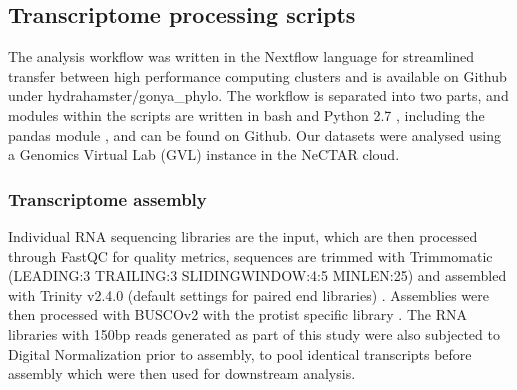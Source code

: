 \documentclass[12pt]{article}
\begin{document}
\subsection*{Transcriptome processing scripts}
The analysis workflow was written in the Nextflow language \cite{nextflow} for streamlined transfer between high performance computing clusters and is available on Github under hydrahamster/gonya\_phylo. 
The workflow is separated into two parts, and modules within the scripts are written in bash and Python 2.7 \cite{python}, including the pandas module \cite{pandas}, and can be found on Github. 
Our datasets were analysed using a Genomics Virtual Lab (GVL) \cite{afgan2015genomics} instance in the NeCTAR cloud.
\subsubsection*{Transcriptome assembly}
Individual RNA sequencing libraries are the input, which are then processed through FastQC \cite{fastqc} for quality metrics, sequences are trimmed with Trimmomatic (LEADING:3 TRAILING:3 SLIDINGWINDOW:4:5 MINLEN:25) \cite{bolger2014trimmomatic} and assembled with Trinity v2.4.0 (default settings for paired end libraries) \cite{haas2013novo}. 
Assemblies were then processed with BUSCOv2 with the protist specific library \cite{simao2015busco}.
The RNA libraries with 150bp reads generated as part of this study were also subjected to Digital Normalization \cite{diginorm} prior to assembly, to pool identical transcripts before assembly which were then used for downstream analysis.                                                                                                                                                                                                                                                                                                                                                                                                                                                                                                                                                                                                                                                                                                                                                                                                                                                                                                                                                                                                                                                                                                                                                                                                                                                                                                                                        
\end{document}
